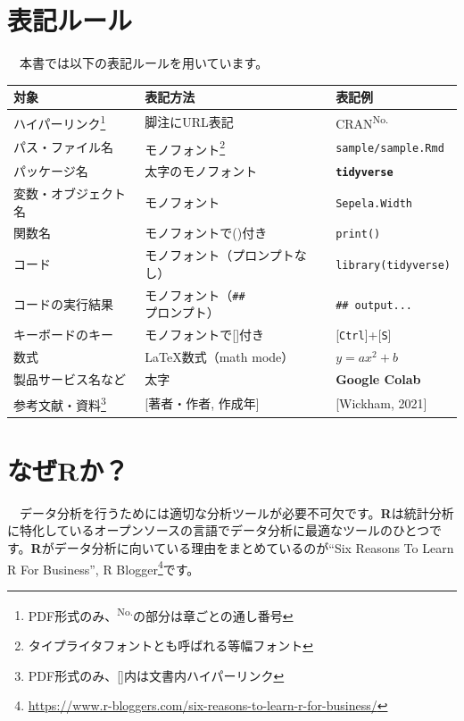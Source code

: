 \documentclass[
  12pt,
]{book}
\DeclareRobustCommand{\href}[2]{#2\footnote{\url{#1}}}
\begin{document}
\hypertarget{ux8868ux8a18ux30ebux30fcux30eb}{%
\section*{表記ルール}\label{ux8868ux8a18ux30ebux30fcux30eb}}

　本書では以下の表記ルールを用いています。

\begin{longtable}[]{@{}lll@{}}
\toprule
対象 & 表記方法 & 表記例 \\
\midrule
\endhead
ハイパーリンク\footnote{PDF形式のみ、\textsuperscript{No.}の部分は章ごとの通し番号} & 脚注にURL表記 & CRAN\textsuperscript{No.} \\
パス・ファイル名 & モノフォント\footnote{タイプライタフォントとも呼ばれる等幅フォント} & \texttt{sample/sample.Rmd} \\
パッケージ名 & 太字のモノフォント & \textbf{\texttt{tidyverse}} \\
変数・オブジェクト名 & モノフォント & \texttt{Sepela.Width} \\
関数名 & モノフォントで()付き & \texttt{print()} \\
コード & モノフォント（プロンプトなし） & \texttt{library(tidyverse)} \\
コードの実行結果 & モノフォント（\texttt{\#\#} プロンプト） & \texttt{\#\#\ output...} \\
キーボードのキー & モノフォントで{[}{]}付き & {[}\texttt{Ctrl}{]}+{[}\texttt{S}{]} \\
数式 & \LaTeX 数式（math mode） & \(y = ax^2 + b\) \\
製品サービス名など & 太字 & \textbf{Google Colab} \\
参考文献・資料\footnote{PDF形式のみ、{[}{]}内は文書内ハイパーリンク} & {[}著者・作者, 作成年{]} & {[}Wickham, 2021{]} \\
\bottomrule
\end{longtable}

\hypertarget{ux306aux305crux304b}{%
\section*{なぜRか？}\label{ux306aux305crux304b}}

　データ分析を行うためには適切な分析ツールが必要不可欠です。\textbf{R}は統計分析に特化しているオープンソースの言語でデータ分析に最適なツールのひとつです。\textbf{R}がデータ分析に向いている理由をまとめているのが\href{https://www.r-bloggers.com/six-reasons-to-learn-r-for-business/}{``Six Reasons To Learn R For Business'', R Blogger}です。
\end{document}
